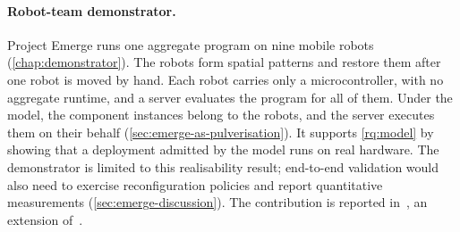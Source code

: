 \paragraph{Robot-team demonstrator.}
Project Emerge runs one aggregate program on nine mobile robots (\cref{chap:demonstrator}).
%
The robots form spatial patterns and restore them after one robot is moved by hand.
%
Each robot carries only a microcontroller, with no aggregate runtime,
and a server evaluates the program for all of them.
%
Under the model, the component instances belong to the robots,
and the server executes them on their behalf (\cref{sec:emerge-as-pulverisation}).
%
It supports \cref{rq:model} by showing that a deployment admitted by the model runs on real hardware.
%
The demonstrator is limited to this realisability result;
end-to-end validation would also need to exercise reconfiguration policies and report quantitative measurements (\cref{sec:emerge-discussion}).
%
The contribution is reported in~\cite{Farabegoli:2027:ProjectEmerge}, an extension of~\cite{DBLP:conf/coordination/AguzziBBCCDFPV25}.

